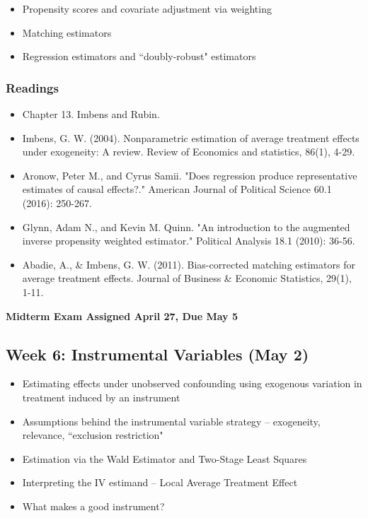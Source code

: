 \documentclass[11pt, article, oneside]{memoir}
\theoremstyle{Assumption}
\begin{document}
\begin{itemize}
\item Propensity scores and covariate adjustment via weighting 
\item Matching estimators
\item Regression estimators and ``doubly-robust" estimators
\end{itemize}


\subsubsection*{Readings}

\begin{itemize}
\item Chapter 13. Imbens and Rubin. 
\item Imbens, G. W. (2004). Nonparametric estimation of average treatment effects under exogeneity: A review. Review of Economics and statistics, 86(1), 4-29.
\item Aronow, Peter M., and Cyrus Samii. "Does regression produce representative estimates of causal effects?." American Journal of Political Science 60.1 (2016): 250-267.
\item Glynn, Adam N., and Kevin M. Quinn. "An introduction to the augmented inverse propensity weighted estimator." Political Analysis 18.1 (2010): 36-56.
\item Abadie, A., \& Imbens, G. W. (2011). Bias-corrected matching estimators for average treatment effects. Journal of Business \& Economic Statistics, 29(1), 1-11.
\end{itemize}

\textbf{Midterm Exam Assigned April 27, Due May 5}

\subsection{Week 6: Instrumental Variables (May 2)}

\begin{itemize}
\item Estimating effects under unobserved confounding using exogenous variation in treatment induced by an instrument
\item Assumptions behind the instrumental variable strategy -- exogeneity, relevance, ``exclusion restriction"
\item Estimation via the Wald Estimator and Two-Stage Least Squares
\item Interpreting the IV estimand -- Local Average Treatment Effect 
\item What makes a good instrument?
\end{itemize}
\end{document}
